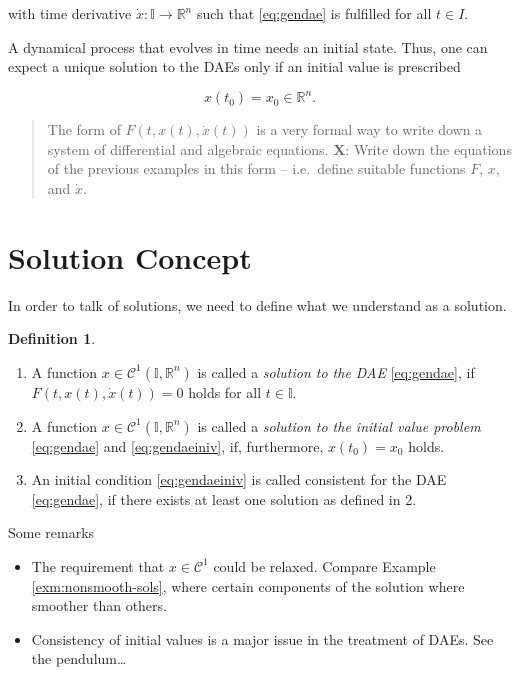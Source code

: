 \documentclass[]{book}
\providecommand{\tightlist}{%
  \setlength{\itemsep}{0pt}\setlength{\parskip}{0pt}}
\newenvironment {JHSAYS} [0] {\begin{quote}\color{jhsc}} {\end{quote}}
\theoremstyle{definition}
\newtheorem{definition}{Definition}[chapter]
\theoremstyle{definition}
\theoremstyle{definition}
\theoremstyle{definition}
\theoremstyle{remark}
\begin{document}
with time derivative \(\dot x \colon \mathbb I \to \mathbb R^{n}\) such that \eqref{eq:gendae} is fulfilled for all \(t\in I\).

A dynamical process that evolves in time needs an initial state. Thus, one can expect a unique solution to the DAEs only if an initial value is prescribed

\begin{equation}
    x(t_0) = x_0 \in \mathbb R^{n}. \label{eq:gendaeiniv} 
\end{equation}

\begin{JHSAYS}
The form of \(F(t, x(t), \dot x(t))\) is a very formal way to write down
a system of differential and algebraic equations. \textbf{X}: Write down
the equations of the previous examples in this form -- i.e.~define
suitable functions \(F\), \(x\), and \(\dot x\).
\end{JHSAYS}

\hypertarget{solution-concept}{%
\section{Solution Concept}\label{solution-concept}}

In order to talk of solutions, we need to define what we understand as a solution.

\begin{definition}
\protect\hypertarget{def:dae-solution}{}{\label{def:dae-solution} }\(\quad\)

\begin{enumerate}
\def\labelenumi{\arabic{enumi}.}
\item
  A function \(x \in \mathcal C^1(\mathbb I, \mathbb R^{n})\) is called a \emph{solution to the DAE} \eqref{eq:gendae}, if \(F(t, x(t), \dot x(t)) = 0\) holds for all \(t\in \mathbb I\).
\item
  A function \(x \in \mathcal C^1(\mathbb I, \mathbb R^{n})\) is called a \emph{solution to the initial value problem} \eqref{eq:gendae} and \eqref{eq:gendaeiniv}, if, furthermore, \(x(t_0)= x_0\) holds.
\item
  An initial condition \eqref{eq:gendaeiniv} is called consistent for the DAE \eqref{eq:gendae}, if there exists at least one solution as defined in 2.
\end{enumerate}
\end{definition}

Some remarks

\begin{itemize}
\tightlist
\item
  The requirement that \(x \in \mathcal C^1\) could be relaxed. Compare Example \ref{exm:nonsmooth-sols}, where certain components of the solution where smoother than others.
\item
  Consistency of initial values is a major issue in the treatment of DAEs. See the pendulum\ldots{}
\end{itemize}
\end{document}
